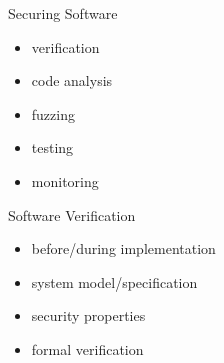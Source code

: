 \documentclass{curs}
\begin{document}

%
%
%

\begin{frame}{Securing Software}
  \begin{itemize}
    \item verification
    \item code analysis
    \item fuzzing
    \item testing
    \item monitoring
  \end{itemize}
\end{frame}

\begin{frame}{Software Verification}
  \begin{itemize}
    \item before/during implementation
    \item system model/specification
    \item security properties
    \item formal verification
  \end{itemize}
\end{frame}
\end{document}
